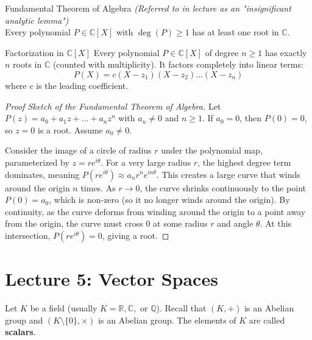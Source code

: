 \documentclass[11pt, a4paper]{article}
\newcommand{\R}{\mathbb{R}}
\newcommand{\Q}{\mathbb{Q}}
\newcommand{\C}{\mathbb{C}}
\begin{document}
\begin{theorem}{Fundamental Theorem of Algebra}{}
\textit{(Referred to in lecture as an "insignificant analytic lemma")} \\
Every polynomial $P \in \C[X]$ with $\deg(P) \ge 1$ has at least one root in $\C$. 
\end{theorem}

\begin{corollary}{Factorization in $\C[X]$}{}
Every polynomial $P \in \C[X]$ of degree $n \ge 1$ has exactly $n$ roots in $\C$ (counted with multiplicity). 
It factors completely into linear terms:
$$ P(X) = c(X - z_1)(X - z_2)\dots(X - z_n) $$ 
where $c$ is the leading coefficient.
\end{corollary}

\begin{proof}[Proof Sketch of the Fundamental Theorem of Algebra]
Let $P(z) = a_0 + a_1z + \dots + a_nz^n$ with $a_n \neq 0$ and $n \ge 1$. 
If $a_0 = 0$, then $P(0) = 0$, so $z=0$ is a root. Assume $a_0 \neq 0$. 

Consider the image of a circle of radius $r$ under the polynomial map, parameterized by $z = re^{i\theta}$. 
For a very large radius $r$, the highest degree term dominates, meaning $P(re^{i\theta}) \approx a_n r^n e^{in\theta}$. 
This creates a large curve that winds around the origin $n$ times. 
As $r \to 0$, the curve shrinks continuously to the point $P(0) = a_0$, which is non-zero (so it no longer winds around the origin). 
By continuity, as the curve deforms from winding around the origin to a point away from the origin, the curve must cross $0$ at some radius $r$ and angle $\theta$. 
At this intersection, $P(re^{i\theta}) = 0$, giving a root. 
\end{proof}

\section{Lecture 5: Vector Spaces}

Let $K$ be a field (usually $K = \R, \C, \text{ or } \Q$). 
Recall that $(K, +)$ is an Abelian group and $(K \setminus \{0\}, \times)$ is an Abelian group. 
The elements of $K$ are called \textbf{scalars}. 
\end{document}
